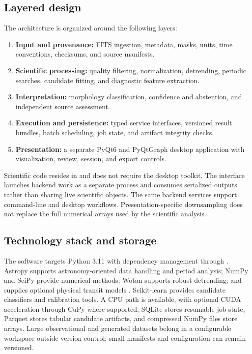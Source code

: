 \documentclass[11pt,a4paper]{article}
\newcommand{\class}[1]{\texttt{\detokenize{#1}}}
\begin{document}
\subsection{Layered design}
The architecture is organized around the following layers:
\begin{enumerate}
\item \textbf{Input and provenance:} FITS ingestion, metadata, masks, units, time conventions, checksums, and source manifests.
\item \textbf{Scientific processing:} quality filtering, normalization, detrending, periodic searches, candidate fitting, and diagnostic feature extraction.
\item \textbf{Interpretation:} morphology classification, confidence and abstention, and independent source assessment.
\item \textbf{Execution and persistence:} typed service interfaces, versioned result bundles, batch scheduling, job state, and artifact integrity checks.
\item \textbf{Presentation:} a separate PyQt6 and PyQtGraph desktop application with visualization, review, session, and export controls.
\end{enumerate}
Scientific code resides in \class{src/transiteye/} and does not require the desktop toolkit. The interface launches backend work as a separate process and consumes serialized outputs rather than sharing live scientific objects. The same backend services support command-line and desktop workflows. Presentation-specific downsampling does not replace the full numerical arrays used by the scientific analysis.

\subsection{Technology stack and storage}
The software targets Python 3.11 with dependency management through \class{uv}. Astropy supports astronomy-oriented data handling and period analysis; NumPy and SciPy provide numerical methods; Wotan supports robust detrending; and \class{batman} supplies optional physical transit models \cite{kreidberg}. Scikit-learn provides candidate classifiers and calibration tools. A CPU path is available, with optional CUDA acceleration through CuPy where supported. SQLite stores resumable job state, Parquet stores tabular candidate artifacts, and compressed NumPy files store arrays. Large observational and generated datasets belong in a configurable workspace outside version control; small manifests and configuration can remain versioned.
\end{document}
